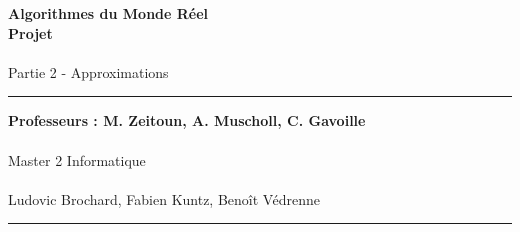 \documentclass[a4paper]{article}
\newlength{\larg}
\begin{document}
\thispagestyle{empty}

\setlength{\unitlength}{1in}


\begin{flushright}
 \noindent {\rule{\larg}{0.5mm}}
\end{flushright}
\vspace{7mm}
\begin{flushright}
 \Huge{\bf Algorithmes du Monde Réel} \\
 \Huge{\bf Projet} \\
 ~\\
 \huge{Partie 2 - Approximations}\\
\end{flushright}
\vspace{7mm}
\begin{flushright}
 {\rule{\larg}{0.5mm}}
\end{flushright}
\vspace{2mm}
\begin{flushright}
 \large{\bf Professeurs : M. Zeitoun, A. Muscholl, C. Gavoille} \\
 ~\\
 \large{Master 2 Informatique}\\
 ~\\
 \vspace{10cm}
 \large{Ludovic Brochard, Fabien Kuntz, Benoît Védrenne}
{\rule{\larg}{0.5mm}}
\end{flushright}

\newpage

\addtolength{\oddsidemargin}{1cm}

\thispagestyle{empty}
\tableofcontents
\newpage

\setcounter{page}{1}



 
 
 
 
 
 
 

\end{document}
